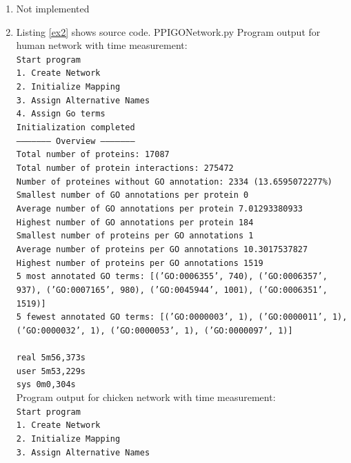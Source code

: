 \documentclass[10pt,a4paper]{article}
\begin{document}
\begin{enumerate}
\item Not implemented

\item Listing \ref{ex2} shows source code.
 {PPIGONetwork.py}
\newpage
Program output for human network with time measurement:\\
\texttt{Start program\\
1. Create Network\\
2. Initialize Mapping\\
3. Assign Alternative Names\\
4. Assign Go terms\\
Initialization completed\\
--------------------- Overview ---------------------\\
Total number of proteins:			17087\\
Total number of protein interactions:		275472\\
Number of proteines without GO annotation:	2334 (13.6595072277\%)\\
Smallest number of GO annotations per protein	0\\
Average number of GO annotations per protein	7.01293380933\\
Highest number of GO annotations per protein	184\\
Smallest number of proteins per GO annotations	1\\
Average number of proteins per GO annotations	10.3017537827\\
Highest number of proteins per GO annotations	1519\\
5 most annotated GO terms:	[('GO:0006355', 740), ('GO:0006357', 937), ('GO:0007165', 980), ('GO:0045944', 1001), ('GO:0006351', 1519)]\\
5 fewest annotated GO terms:	[('GO:0000003', 1), ('GO:0000011', 1), ('GO:0000032', 1), ('GO:0000053', 1), ('GO:0000097', 1)]\\
\\
real	5m56,373s\\
user	5m53,229s\\
sys	0m0,304s\\
}
\newpage
Program output for chicken network with time measurement:\\
\texttt{Start program\\
1. Create Network\\
2. Initialize Mapping\\
3. Assign Alternative Names\\
}
\end{enumerate}
\end{document}
